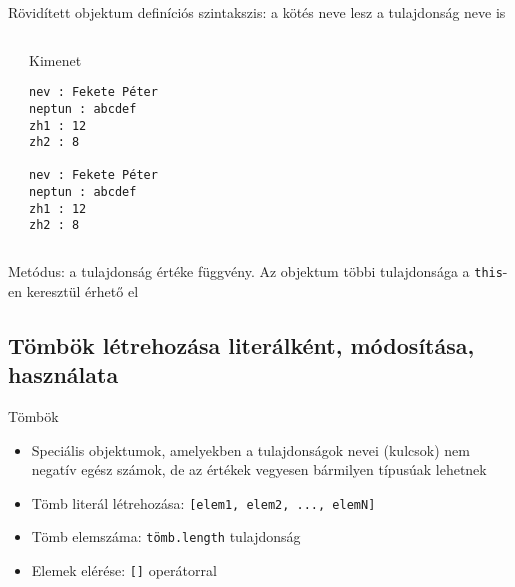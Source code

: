 \begin{frame}[fragile]
  Rövidített objektum definíciós szintakszis: a kötés neve lesz a tulajdonság neve is
  \scriptsize
  \begin{columns}[T]
      \begin{exampleblock}{}
        
      \end{exampleblock}
      \begin{block}{Kimenet}
        \begin{verbatim}
nev : Fekete Péter
neptun : abcdef
zh1 : 12
zh2 : 8

nev : Fekete Péter
neptun : abcdef
zh1 : 12
zh2 : 8
\end{verbatim}
      \end{block}
  \end{columns}
\end{frame}

\begin{frame}
  Metódus: a tulajdonság értéke függvény. Az objektum többi tulajdonsága a \texttt{this}-en keresztül érhető el
  \vfill
  \small
  \begin{exampleblock}{}
    
  \end{exampleblock}
\end{frame}

\subsection{Tömbök létrehozása literálként, módosítása, használata}

\begin{frame}
  Tömbök
  \begin{itemize}
    \item Speciális objektumok, amelyekben a tulajdonságok nevei (kulcsok) nem negatív egész számok, de az értékek vegyesen bármilyen típusúak lehetnek
    \item Tömb literál létrehozása: \texttt{[elem1, elem2, ..., elemN]}
    \item Tömb elemszáma: \texttt{tömb.length} tulajdonság
    \item Elemek elérése: \texttt{[]} operátorral
  \end{itemize}
  \footnotesize
  \begin{exampleblock}{}
    \vspace{-0.3cm}
    
    \vspace{-0.3cm}
  \end{exampleblock}
\end{frame}


